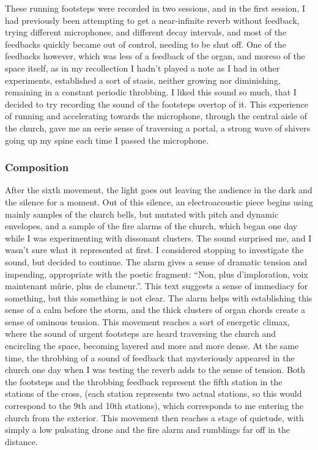 \documentclass[12pt,twoside,maitrise]{dms}
\theoremstyle{definition}
\begin{document}
These running footsteps were recorded in two sessions, and in the first session, I had previously been attempting to get a near-infinite reverb without feedback, trying different microphones, and different decay intervals, and most of the feedbacks quickly became out of control, needing to be shut off.
One of the feedbacks however, which was less of a feedback of the organ, and moreso of the space itself, as in my recollection I hadn't played a note as I had in other experiments, established a sort of stasis, neither growing nor diminishing, remaining in a constant periodic throbbing.
I liked this sound so much, that I decided to try recording the sound of the footsteps overtop of it.
This experience of running and accelerating towards the microphone, through the central aisle of the church, gave me an eerie sense of traversing a portal, a strong wave of shivers going up my spine each time I passed the microphone.

\subsubsection{Composition}

After the sixth movement, the light goes out leaving the audience in the dark and the silence for a moment.
Out of this silence, an electroacoustic piece begins using mainly samples of the church bells, but mutated with pitch and dynamic envelopes, and a sample of the fire alarms of the church, which began one day while I was experimenting with dissonant clusters.
The sound surprised me, and I wasn’t sure what it represented at first.
I considered stopping to investigate the sound, but decided to continue.
The alarm gives a sense of dramatic tension and impending, appropriate with the poetic fragment: “Non, plus d’imploration, voix maintenant mûrie, plus de clameur.”.
This text suggests a sense of immediacy for something, but this something is not clear.
The alarm helps with establishing this sense of a calm before the storm, and the thick clusters of organ chords create a sense of ominous tension.
This movement reaches a sort of energetic climax, where the sound of urgent footsteps are heard traversing the church and encircling the space, becoming layered and more and more dense.
At the same time, the throbbing of a sound of feedback that mysteriously appeared in the church one day when I was testing the reverb adds to the sense of tension.
Both the footsteps and the throbbing feedback represent the fifth station in the stations of the cross, (each station represents two actual stations, so this would correspond to the 9th and 10th stations), which corresponds to me entering the church from the exterior.
This movement then reaches a stage of quietude, with simply a low pulsating drone and the fire alarm and rumblings far off in the distance.
\end{document}
